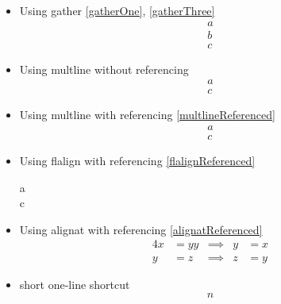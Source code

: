 \documentclass{article}
\def\ifautonum#1{#1}%
\def\ifautonum#1{}%
\begin{document}
\begin{itemize}
		\item Using gather \ref{gatherOne}, \ref{gatherThree}
			\begin{gather}
				a\label{gatherOne}\\
				b\label{gatherTwo}\\
				c\label{gatherThree}
			\end{gather}
		\item Using multline without referencing
			\begin{multline}
				a\\
				c\label{multlineUnreferenced}
			\end{multline}
		\item Using multline with referencing \ref{multlineReferenced}
			\begin{multline}
				a\\
				c\label{multlineReferenced}
			\end{multline}
		\item Using flalign with referencing \ref{flalignReferenced}
			\begin{flalign}
				a\\
				c\label{flalignReferenced}
			\end{flalign}
		\item Using alignat with referencing \ref{alignatReferenced}
			\begin{alignat}{4}
				x &= yy & \implies & y &= x \label{alignatUnreferenced}\\
				y &= z & \implies & z &= y \label{alignatReferenced}
			\end{alignat}
		\item short one-line shortcut \[n\]
		\ifautonum{
			\item align, numbering always \begin{align+} a=l \end{align+} (needs autonum)
			\item gather, numbering always \begin{gather+} g=a \end{gather+} (needs autonum)
			\item multline, numbering always (and avoiding overfull hbox warning) \begin{multline+} m=u\line(1,0){220}=v \end{multline+} (needs autonum)
			\item equation, numbering always \begin{equation+} e=q \end{equation+} (needs autonum)
}
\end{itemize}
\end{document}
